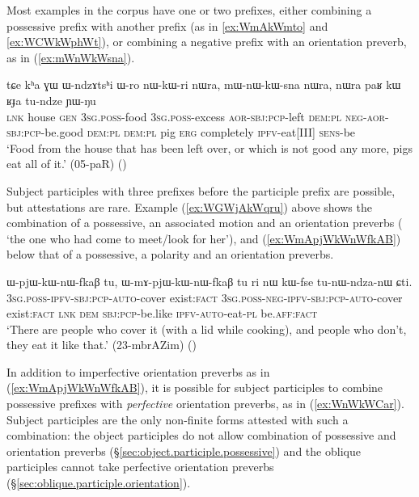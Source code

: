 Most examples in the corpus have one or two prefixes, either combining a possessive prefix with another prefix (as in \ref{ex:WmAkWmto} and \ref{ex:WCWkWphWt}), or combining a negative prefix with an orientation preverb, as in (\ref{ex:mWnWkWsna}).

 \begin{exe}
\ex \label{ex:mWnWkWsna}
 \gll tɕe kʰa ɣɯ ɯ-ndzɤtsʰi ɯ-ro nɯ-kɯ-ri nɯra, mɯ-nɯ-kɯ-sna nɯra, nɯra paʁ kɯ ʁɟa tu-ndze ɲɯ-ŋu \\
 \textsc{lnk} house \textsc{gen} \textsc{3sg}.\textsc{poss}-food \textsc{3sg}.\textsc{poss}-excess \textsc{aor}-\textsc{sbj}:\textsc{pcp}-left \textsc{dem}:\textsc{pl}  \textsc{neg}-\textsc{aor}-\textsc{sbj}:\textsc{pcp}-be.good \textsc{dem}:\textsc{pl} \textsc{dem}:\textsc{pl} pig \textsc{erg} completely  \textsc{ipfv}-eat[III] \textsc{sens}-be \\
 \glt  `Food from the house that has been left over, or which is not good any more, pigs eat all of it.' (05-paR)
()
\end{exe}

Subject participles with three prefixes before the participle prefix  are possible, but attestations are rare. Example (\ref{ex:WGWjAkWqru}) above shows the combination of a possessive, an associated motion and an orientation preverbs ( `the one who had come to meet/look for her'), and (\ref{ex:WmApjWkWnWfkAB}) below that of a possessive, a polarity and an orientation preverbs.

\begin{exe}
\ex \label{ex:WmApjWkWnWfkAB}
 \gll ɯ-pjɯ-kɯ-nɯ-fkaβ tu, ɯ-mɤ-pjɯ-kɯ-nɯ-fkaβ tu ri nɯ kɯ-fse tu-nɯ-ndza-nɯ ɕti. \\
 \textsc{3sg}.\textsc{poss}-\textsc{ipfv}-\textsc{sbj}:\textsc{pcp}-\textsc{auto}-cover exist:\textsc{fact}  \textsc{3sg}.\textsc{poss}-\textsc{neg}-\textsc{ipfv}-\textsc{sbj}:\textsc{pcp}-\textsc{auto}-cover exist:\textsc{fact} \textsc{lnk} \textsc{dem} \textsc{sbj}:\textsc{pcp}-be.like \textsc{ipfv}-\textsc{auto}-eat-\textsc{pl} be.\textsc{aff}:\textsc{fact} \\
 \glt `There are people who cover it (with a lid while cooking), and people who don't, they eat it like that.' (23-mbrAZim)
()
\end{exe}

In addition to imperfective orientation preverbs as in (\ref{ex:WmApjWkWnWfkAB}), it is possible for subject participles to combine possessive prefixes with \textit{perfective} orientation preverbs, as in (\ref{ex:WnWkWCar}). Subject participles are the only non-finite forms attested with such a combination: the object participles do not allow combination of possessive and orientation preverbs (§\ref{sec:object.participle.possessive}) and the oblique participles cannot take perfective orientation preverbs (§\ref{sec:oblique.participle.orientation}).

